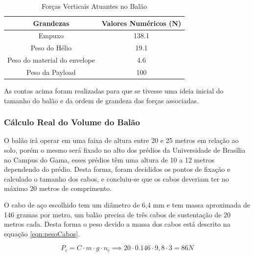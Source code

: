 	\begin{table}[htp]
		\centering
		\caption{Forças Verticais Atuantes no Balão}
		\begin{tabular}{|c|c|}
			\hline
			\rowcolor[HTML]{FFFFFF}
			{\color[HTML]{000000} \textbf{Grandezas}} & {\color[HTML]{000000} \textbf{Valores Numéricos (N)}} \\ \hline
			Empuxo                                    & 138.1                                                 \\ \hline
			Peso do Hélio                             & 19.1                                                  \\ \hline
			Peso do material do envelope              & 4.6                                                   \\ \hline
			Peso da Payload                           & 100                                                   \\ \hline
		\end{tabular}
		\label{tab:forcasVerticaisAtuantes}
	\end{table}

	As contas acima foram realizadas para que se tivesse uma ideia inicial do tamanho do balão e da ordem de grandeza das forças associadas.

\subsubsection{Cálculo Real do Volume do Balão}

O  balão irá operar em uma faixa de altura entre 20 e 25 metros em relação ao solo, porém  o mesmo será fixado no alto dos prédios da Universidade de Brasília no Campus do Gama, esses prédios têm uma altura de 10 a 12 metros dependendo do prédio. Desta forma, foram decididos os pontos de fixação e calculado o tamanho dos cabos, e concluiu-se que os cabos deveriam ter no máximo 20 metros de comprimento.

O cabo de aço escolhido tem um diâmetro de 6,4 mm e tem massa aproximada de 146 gramas por metro, um balão precisa de três cabos de sustentação de 20 metros cada. Desta forma o peso devido a massa dos cabos está descrito na equação \eqref{eqn:pesoCabos}.

\begin{equacao}
\caption{Peso dos cabos}
	\begin{equation}
		P_{c} = C \cdot m \cdot g \cdot n_{c} \implies 20 \cdot 0.146 \cdot 9,8 \cdot 3 = 86 N
	\end{equation}
	\label{eqn:pesoCabos}
\end{equacao}

